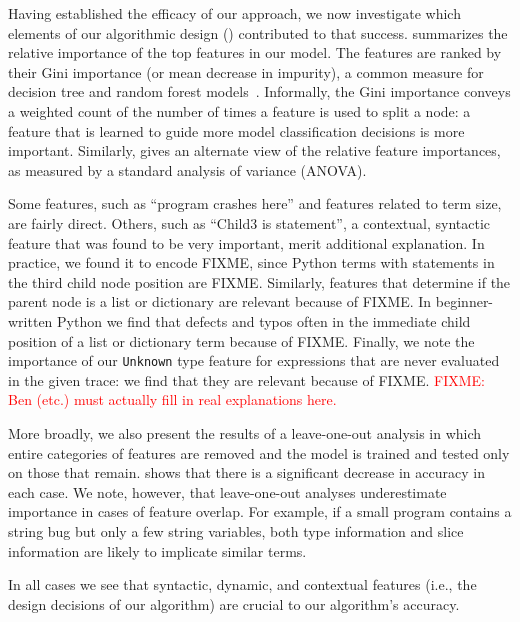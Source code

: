 \documentclass[conference]{IEEEtran}
\newcommand{\fixme}[1]{\textcolor{red}{FIXME: #1}}
\newcommand\lt[1]{{\lstinline|#1|}}
\begin{document}
Having established the efficacy of our approach, we now investigate which
elements of our algorithmic design () contributed to that
success. 
 summarizes the relative importance
of the top features in our model. The features are ranked by their
Gini importance (or mean decrease in impurity), a common measure
for decision tree and random forest models~\cite{breiman2001random}. Informally, the
Gini importance conveys a weighted count of the number of times a feature
is used to split a node: a feature that is learned to guide more model
classification decisions is more important. Similarly,  gives
an alternate view of the relative feature importances, as measured by a
standard analysis of variance (ANOVA).

Some features, such as ``program crashes here'' and features
related to term size, are fairly direct. Others, such as ``Child3 is
statement'', a contextual, syntactic feature that was found to be very
important, merit additional explanation. In practice, we found it to
encode FIXME, since Python terms with statements in the third child node
position are FIXME. Similarly, features that determine if the parent node
is a list or dictionary are relevant because of FIXME. In beginner-written
Python we find that defects and typos often in the immediate child position
of a list or dictionary term because of FIXME. Finally, we note the
importance of our \lt{Unknown} type feature for expressions that are never
evaluated in the given trace: we find that they are relevant because of
FIXME. \fixme{Ben (etc.) must actually fill in real explanations here.} 

More broadly, we also present the results of a leave-one-out analysis in which
entire categories of features are removed and the model is trained
and tested only on those that remain.  shows
that there is a significant decrease in accuracy in each case. We note,
however, that leave-one-out analyses underestimate importance in cases of
feature overlap. For example, if a small program contains a string bug but
only a few string variables, both type information and slice information
are likely to implicate similar terms.

In all cases we see that syntactic, dynamic, and contextual features (i.e.,
the design decisions of our algorithm) are crucial to our algorithm's
accuracy. 

\end{document}
